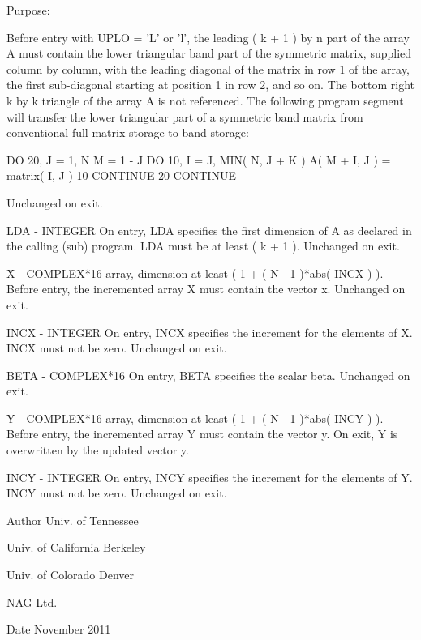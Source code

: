 \begin{DoxyParagraph}{Purpose\+: }
\begin{DoxyVerb}
           Before entry with UPLO = 'L' or 'l', the leading ( k + 1 )
           by n part of the array A must contain the lower triangular
           band part of the symmetric matrix, supplied column by
           column, with the leading diagonal of the matrix in row 1 of
           the array, the first sub-diagonal starting at position 1 in
           row 2, and so on. The bottom right k by k triangle of the
           array A is not referenced.
           The following program segment will transfer the lower
           triangular part of a symmetric band matrix from conventional
           full matrix storage to band storage:

                 DO 20, J = 1, N
                    M = 1 - J
                    DO 10, I = J, MIN( N, J + K )
                       A( M + I, J ) = matrix( I, J )
              10    CONTINUE
              20 CONTINUE

           Unchanged on exit.

  LDA    - INTEGER
           On entry, LDA specifies the first dimension of A as declared
           in the calling (sub) program. LDA must be at least
           ( k + 1 ).
           Unchanged on exit.

  X      - COMPLEX*16 array, dimension at least
           ( 1 + ( N - 1 )*abs( INCX ) ).
           Before entry, the incremented array X must contain the
           vector x.
           Unchanged on exit.

  INCX   - INTEGER
           On entry, INCX specifies the increment for the elements of
           X. INCX must not be zero.
           Unchanged on exit.

  BETA   - COMPLEX*16
           On entry, BETA specifies the scalar beta.
           Unchanged on exit.

  Y      - COMPLEX*16 array, dimension at least
           ( 1 + ( N - 1 )*abs( INCY ) ).
           Before entry, the incremented array Y must contain the
           vector y. On exit, Y is overwritten by the updated vector y.

  INCY   - INTEGER
           On entry, INCY specifies the increment for the elements of
           Y. INCY must not be zero.
           Unchanged on exit.\end{DoxyVerb}
 
\end{DoxyParagraph}
\begin{DoxyAuthor}{Author}
Univ. of Tennessee 

Univ. of California Berkeley 

Univ. of Colorado Denver 

N\+A\+G Ltd. 
\end{DoxyAuthor}
\begin{DoxyDate}{Date}
November 2011 
\end{DoxyDate}
\hypertarget{group__complex16__lin_ga1726c70221988e5ffd6cc9936d7987cd}{}
